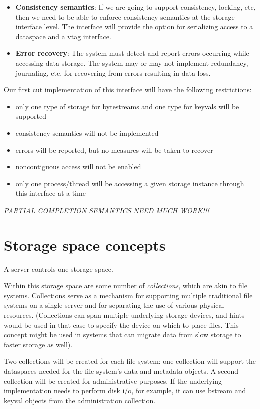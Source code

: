 \documentclass[10pt]{article} %
\begin{document}
\begin{itemize}
\item \textbf{Consistency semantics}:  If we are going to support
consistency, locking, etc, then we need to be able to enforce
consistency semantics at the storage interface level.  The interface
will provide the option for serializing access to a dataspace and a vtag
interface.

\item \textbf{Error recovery}:  The system must detect and report errors
occurring while accessing data storage.  The system may or may not
implement redundancy, journaling, etc. for recovering from errors
resulting in data loss.
\end{itemize}

Our first cut implementation of this interface will have the following
restrictions:
\begin{itemize}
\item only one type of storage for bytestreams and one type for keyvals
      will be supported
\item consistency semantics will not be implemented
\item errors will be reported, but no measures will be taken to recover
\item noncontiguous access will not be enabled
\item only one process/thread will be accessing a given storage instance
      through this interface at a time
\end{itemize}

\emph{PARTIAL COMPLETION SEMANTICS NEED MUCH WORK!!!}

\section{Storage space concepts}

A server controls one storage space.

Within this storage space are some number of \emph{collections}, which
are akin to file systems.  Collections serve as a mechanism for
supporting multiple traditional file systems on a single server and for
separating the use of various physical resources.  (Collections can span
multiple underlying storage devices, and hints would be used in that case to
specify the device on which to place files.  This concept might be used in
systems that can migrate data from slow storage to faster storage as well).

Two collections will be created for each file system: one collection will
support the dataspaces needed for the file system's data and metadata objects.
A second collection will be created for administrative purposes.  If the
underlying implementation needs to perform disk i/o, for example, it can use
bstream and keyval objects from the administration collection. 
\end{document}
